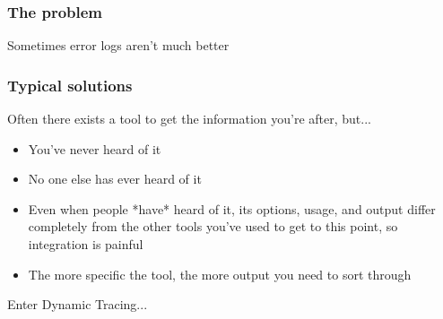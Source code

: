 \documentclass{beamer}
\begin{document}
\begin{frame}
    \frametitle{The problem}
    Sometimes error logs aren't much better
    \begin{figure}[b]
    \begin{centering}
    \end{centering}
    \end{figure}
\end{frame}

\begin{frame}
    \frametitle{Typical solutions}
    Often there exists a tool to get the information you're after, but...
    \begin{itemize}
        \item<2->You've never heard of it
        \item<3->No one else has ever heard of it
        \item<4->Even when people *have* heard of it, its options, usage, and output differ completely from the other tools you've used to get to this point, so integration is painful
        \item<5->The more specific the tool, the more output you need to sort through
    \end{itemize}
\end{frame}

\begin{frame}
    Enter Dynamic Tracing...
\end{frame}
\end{document}
